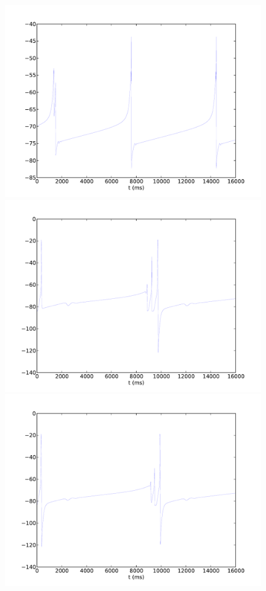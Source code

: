 \documentclass[a4paper,12pt]{article}
\begin{document}
\begin{figure}
\includegraphics[scale=0.4]{chosen-frontiers-2012/00493-ode-he-intra.pdf}
\includegraphics[scale=0.4]{chosen-frontiers-2012/00493-0_1-he-intra.pdf}
\includegraphics[scale=0.4]{chosen-frontiers-2012/00493-0_11-he-intra.pdf}

\end{figure}
\end{document}
